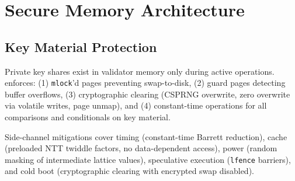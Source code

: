 \section{Secure Memory Architecture}


\subsection{Key Material Protection}

Private key shares exist in validator memory only during active operations. \KChain{} enforces: (1) \texttt{mlock}'d pages preventing swap-to-disk, (2) guard pages detecting buffer overflows, (3) cryptographic clearing (CSPRNG overwrite, zero overwrite via volatile writes, page unmap), and (4) constant-time operations for all comparisons and conditionals on key material.

Side-channel mitigations cover timing (constant-time Barrett reduction), cache (preloaded NTT twiddle factors, no data-dependent access), power (random masking of intermediate lattice values), speculative execution (\texttt{lfence} barriers), and cold boot (cryptographic clearing with encrypted swap disabled).

